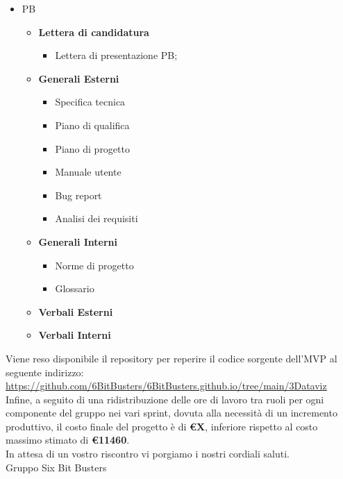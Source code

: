 \begin{titlepage}
        \begin{itemize}
                \item PB
                \begin{itemize}
                        \item \textbf{Lettera di candidatura}
                        \begin{itemize}
                                \item Lettera di presentazione PB;
                        \end{itemize}
                        \item \textbf{Generali Esterni}
                        \begin{itemize}
                                \item Specifica tecnica
                                \item Piano di qualifica
                                \item Piano di progetto
                                \item Manuale utente
                                \item Bug report
                                \item Analisi dei requisiti
                        \end{itemize}
                        \item \textbf{Generali Interni}
                        \begin{itemize}
                                \item Norme di progetto
                                \item Glossario
                        \end{itemize}
                        \item \textbf{Verbali Esterni}
                        \item \textbf{Verbali Interni}
                \end{itemize}
        \end{itemize}

        

        \noindent Viene reso disponibile il repository per reperire il codice sorgente dell'MVP al seguente indirizzo: 
        \url{https://github.com/6BitBusters/6BitBusters.github.io/tree/main/3Dataviz}\\

        \noindent Infine, a seguito di una ridistribuzione delle ore di lavoro tra ruoli per ogni componente del gruppo nei vari sprint, dovuta alla necessità di un incremento produttivo, il costo finale del progetto è di \textbf{\euro X}, inferiore rispetto al
        costo massimo stimato di \textbf{\euro 11460}.\\
	
	\noindent In attesa di un vostro riscontro vi porgiamo i nostri cordiali saluti.\\
        Gruppo Six Bit Busters
	
\end{titlepage}

